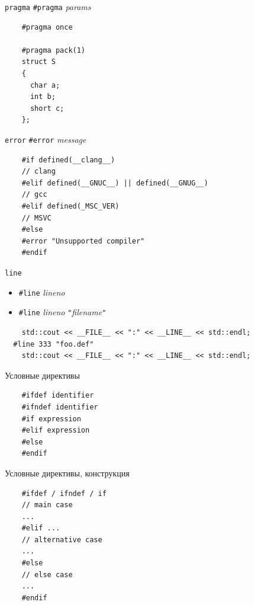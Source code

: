 \documentclass[unknownkeysallowed,xcolor=table]{beamer}
\begin{document}
\begin{frame}[fragile]{\lstinline{pragma}}
  \lstinline{#pragma} \emph{params}

  \begin{lstlisting}
    #pragma once

    #pragma pack(1)
    struct S
    {
      char a;
      int b;
      short c;
    };
  \end{lstlisting}
\end{frame}

\begin{frame}[fragile]{\lstinline{error}}
  \lstinline{#error} \emph{message}

  \begin{lstlisting}
    #if defined(__clang__)
    // clang
    #elif defined(__GNUC__) || defined(__GNUG__)
    // gcc
    #elif defined(_MSC_VER)
    // MSVC
    #else
    #error "Unsupported compiler"
    #endif
  \end{lstlisting}
\end{frame}

\begin{frame}[fragile]{\lstinline{line}}
  \begin{itemize}
    \item \lstinline{#line} \emph{lineno}
    \item \lstinline{#line} \emph{lineno} \lstinline{"}\emph{filename}\lstinline{"}
  \end{itemize}
  \begin{lstlisting}
    std::cout << __FILE__ << ":" << __LINE__ << std::endl;
  #line 333 "foo.def"
    std::cout << __FILE__ << ":" << __LINE__ << std::endl;
  \end{lstlisting}
\end{frame}

\begin{frame}[fragile]{Условные директивы}
  \begin{lstlisting}
    #ifdef identifier
    #ifndef identifier
    #if expression
    #elif expression
    #else
    #endif
  \end{lstlisting}
\end{frame}

\begin{frame}[fragile]{Условные директивы, конструкция}
  \begin{lstlisting}
    #ifdef / ifndef / if
    // main case
    ...
    #elif ...
    // alternative case
    ...
    #else
    // else case
    ...
    #endif
  \end{lstlisting}
\end{frame}
\end{document}
